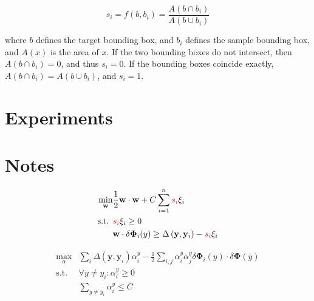 \documentclass{IEEEtran}
\renewcommand{\vec}[1]{\mathbf{#1}}
\newcommand{\half}{\frac{1}{2}}
\newcommand{\loss}{\Delta\left(\vec{y}, \vec{y}_i\right)}
\begin{document}
\begin{displaymath}
    s_i = f\left(b, b_i\right) = \frac{A(b \cap b_i)}{A(b \cup b_i)}
\end{displaymath}

where \(b\) defines the target bounding box, and \(b_i\) defines the sample bounding box, and
\(A(x)\) is the area of \(x\). If the two bounding boxes do not intersect, then \(A\left(b \cap
b_i\right) = 0\), and thus \(s_i = 0\). If the bounding boxes coincide exactly,
\(A\left(b \cap b_i\right) = A\left(b \cup b_i\right)\), and \(s_i = 1\).

\section{Experiments}

\section{Notes} %
\begin{align*}
    \min_\vec{w} & \half \vec{w} \cdot \vec{w} + C \sum_{i=1}^n \textcolor{red}{s_i} \xi_i \\
    \text{s.t. } & \textcolor{red}{s_i} \xi_i \ge 0 \\
    & \vec{w} \cdot \delta \vec{\Phi}_i(y) \ge \loss - \textcolor{red}{s_i} \xi_i
\end{align*}

\begin{align*}
    \max_\alpha & \sum_i \loss \alpha_i^y - \half \sum_{i,j} \alpha_i^y
    \alpha_j^{\bar{y}} \delta \vec{\Phi}_i(y) \cdot \delta \vec{\Phi}(\bar{y}) \\
    \text{s.t. } & \forall y \ne y_i : \alpha_i^y \ge 0 \\
    & \sum_{y \ne y_i} \alpha_i^y \le C
\end{align*}

\newpage
\end{document}
